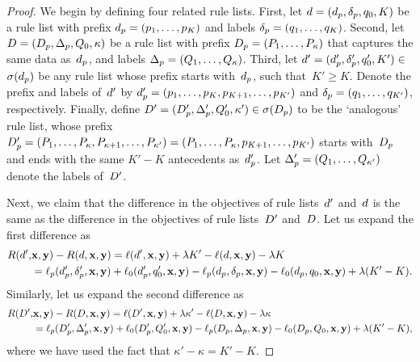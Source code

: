 \begin{proof}
We begin by defining four related rule lists.
%
First, let ${{d} = (d_p, \delta_p, q_0, K)}$
be a rule list with prefix ${d_p = (p_1, \dots, p_K)}$
and labels ${\delta_p = (q_1, \dots, q_K)}$.
%
Second, let ${{D} = (D_p, \Delta_p, Q_0, \kappa)}$
be a rule list with prefix ${D_p = (P_1, \dots, P_\kappa)}$
that captures the same data as~$d_p$,
and labels ${\Delta_p = (Q_1, \dots, Q_\kappa)}$.
%
Third, let ${{d}' = (d_p', \delta_p', q_0', K') \in}$
${\sigma(d_p)}$ be any rule list
whose prefix starts with~$d_p$, such that~${K' \ge K}$.
%
Denote the prefix and labels of~${d}'$ by
${d_p' = (p_1, \dots, p_K, p_{K+1}, \dots, p_{K'})}$
and ${\delta_p = (q_1, \dots, q_{K'})}$, respectively.
%
Finally, define
${{D}' = (D_p', \Delta_p', Q_0', \kappa') \in \sigma(D_p)}$
to be the `analogous' rule list, \ie whose prefix
${D_p' = (P_1, \dots, P_\kappa, P_{\kappa+1}, \dots, P_{\kappa'})
= (P_1, \dots, P_\kappa, p_{K+1}, \dots, p_{K'})}$
starts with~$D_p$ and ends with the same ${K'-K}$
antecedents as~$d_p'$.
%
Let ${\Delta_p' = (Q_1, \dots, Q_{\kappa'})}$
denote the labels of~${D}'$.

Next, we claim that the difference in the objectives
of rule lists~${d}'$ and~${d}$ is the same as the difference
in the objectives of rule lists~${D}'$ and~${D}$.
%
Let us expand the first difference as
\begin{align}
\Obj(\RL',& \x, \y) - \Obj(\RL, \x, \y)
  = \Loss(\RL', \x, \y) + \Reg K' - \Loss(\RL, \x, \y) - \Reg K \nn \\
&= \Loss_p(\Prefix', \Labels', \x, \y) + \Loss_0(\Prefix', \Default', \x, \y)
  - \Loss_p(\Prefix, \Labels, \x, \y) - \Loss_0(\Prefix, \Default, \x, \y)
  + \Reg (K' - K).
\end{align}
Similarly, let us expand the second difference as
\begin{align}
\Obj(\RLB',& \x, \y) - \Obj(\RLB, \x, \y)
  = \Loss(\RLB', \x, \y) + \Reg \kappa' - \Loss(\RLB, \x, \y) - \Reg \kappa \nn \\
&= \Loss_p(\PrefixB', \LabelsB', \x, \y) + \Loss_0(\PrefixB', \DefaultB', \x, \y)
  - \Loss_p(\PrefixB, \LabelsB, \x, \y) - \Loss_0(\PrefixB, \DefaultB, \x, \y)
  + \Reg (K' - K),
\end{align}
where we have used the fact that ${\kappa' - \kappa = K' - K}$.


\end{proof}

